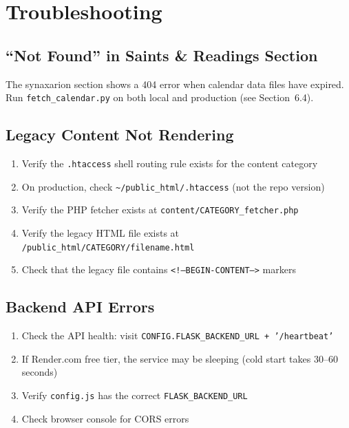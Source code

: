\documentclass[12pt]{article}
\begin{document}
\section{Troubleshooting}

\subsection{``Not Found'' in Saints \& Readings Section}

The synaxarion section shows a 404 error when calendar data files have expired. Run \texttt{fetch\_calendar.py} on both local and production (see Section~6.4).

\subsection{Legacy Content Not Rendering}

\begin{enumerate}
    \item Verify the \texttt{.htaccess} shell routing rule exists for the content category
    \item On production, check \texttt{\textasciitilde/public\_html/.htaccess} (not the repo version)
    \item Verify the PHP fetcher exists at \texttt{content/CATEGORY\_fetcher.php}
    \item Verify the legacy HTML file exists at \texttt{/public\_html/CATEGORY/filename.html}
    \item Check that the legacy file contains \texttt{<!--BEGIN-CONTENT-->} markers
\end{enumerate}

\subsection{Backend API Errors}

\begin{enumerate}
    \item Check the API health: visit \texttt{CONFIG.FLASK\_BACKEND\_URL + '/heartbeat'}
    \item If Render.com free tier, the service may be sleeping (cold start takes 30--60 seconds)
    \item Verify \texttt{config.js} has the correct \texttt{FLASK\_BACKEND\_URL}
    \item Check browser console for CORS errors
\end{enumerate}
\end{document}
